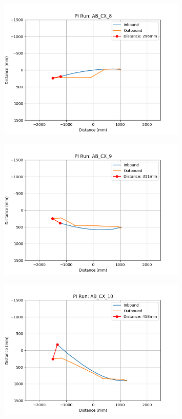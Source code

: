 \documentclass[a4paper,11pt,twoside,openright]{article}
\begin{document}
\begin{figure}[h!]
  \centering
  \includegraphics[width=0.8\textwidth]{AB_CX_8}
  \caption{\label{fig:abcx8}}
\end{figure}

\begin{figure}[h!]
  \centering
  \includegraphics[width=0.8\textwidth]{AB_CX_9}
  \caption{\label{fig:abcx9}}
\end{figure}

\begin{figure}[h!]
  \centering
  \includegraphics[width=0.8\textwidth]{AB_CX_10}
  \caption{\label{fig:abcx10}}
\end{figure}
\end{document}
